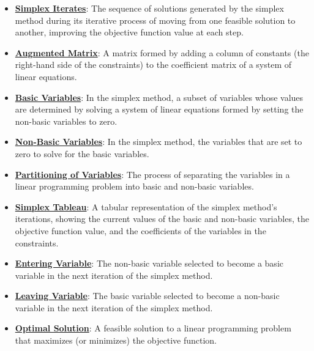 \documentclass{article}%
\begin{document}
\begin{itemize}[leftmargin=*]
\item \href{https://www.math.purdue.edu/~yipn/421/2024-09-24-SimplexMatrix.pdf#page=2}{\textbf{Simplex Iterates}}: The sequence of solutions generated by the simplex method during its iterative process of moving from one feasible solution to another, improving the objective function value at each step.%
\item \href{https://www.math.purdue.edu/~yipn/421/2024-09-24-SimplexMatrix.pdf#page=3}{\textbf{Augmented Matrix}}: A matrix formed by adding a column of constants (the right-hand side of the constraints) to the coefficient matrix of a system of linear equations.%
\item \href{https://www.math.purdue.edu/~yipn/421/2024-09-24-SimplexMatrix.pdf#page=4}{\textbf{Basic Variables}}: In the simplex method, a subset of variables whose values are determined by solving a system of linear equations formed by setting the non-basic variables to zero.%
\item \href{https://www.math.purdue.edu/~yipn/421/2024-09-24-SimplexMatrix.pdf#page=4}{\textbf{Non{-}Basic Variables}}: In the simplex method, the variables that are set to zero to solve for the basic variables.%
\item \href{https://www.math.purdue.edu/~yipn/421/2024-09-24-SimplexMatrix.pdf#page=4}{\textbf{Partitioning of Variables}}: The process of separating the variables in a linear programming problem into basic and non-basic variables.%
\item \href{https://www.math.purdue.edu/~yipn/421/2024-09-24-SimplexMatrix.pdf#page=10}{\textbf{Simplex Tableau}}: A tabular representation of the simplex method's iterations, showing the current values of the basic and non-basic variables, the objective function value, and the coefficients of the variables in the constraints.%
\item \href{https://www.math.purdue.edu/~yipn/421/2024-09-24-SimplexMatrix.pdf#page=17}{\textbf{Entering Variable}}: The non-basic variable selected to become a basic variable in the next iteration of the simplex method.%
\item \href{https://www.math.purdue.edu/~yipn/421/2024-09-24-SimplexMatrix.pdf#page=17}{\textbf{Leaving Variable}}: The basic variable selected to become a non-basic variable in the next iteration of the simplex method.%
\item \href{https://www.math.purdue.edu/~yipn/421/2024-09-24-SimplexMatrix.pdf#page=16}{\textbf{Optimal Solution}}: A feasible solution to a linear programming problem that maximizes (or minimizes) the objective function.%

\end{itemize}
\end{document}
